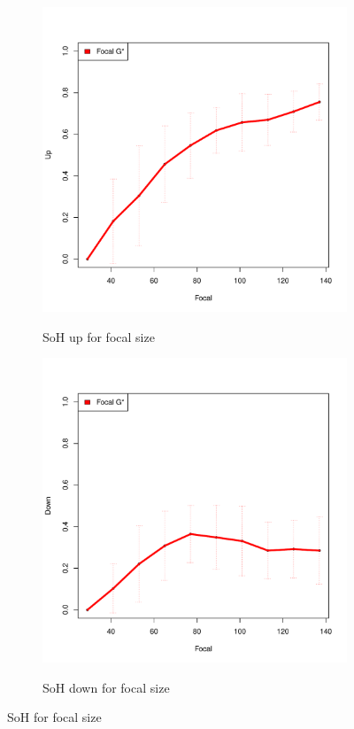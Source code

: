 \documentclass{itatnew}
\begin{document}
\begin{figure}[htp]
  \begin{subfigure}{\linewidth}
    \caption{SoH up for focal size}
    \includegraphics[width=\linewidth]{images/whiskerPlot/fUp}
    \label{fig:fUp}
  \end{subfigure}
  \hspace{1em}
  \begin{subfigure}{\linewidth}
    \caption{SoH down for focal size}
    \includegraphics[width=\linewidth]{images/whiskerPlot/fDown}
    \label{fig:fDown}
  \end{subfigure}
  \caption{SoH for focal size}
  \label{fig:SoHFocal}
\end{figure}
\end{document}
